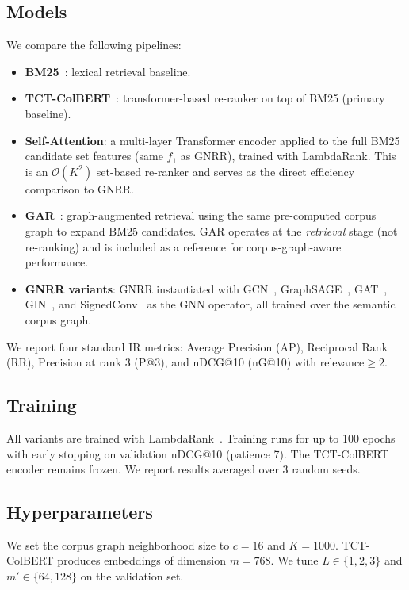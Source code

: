 \documentclass[runningheads]{llncs}
\newcommand{\ModelName}{GNRR\xspace}
\begin{document}
\subsection{Models}
We compare the following pipelines:
\begin{itemize}
    \item \textbf{BM25}~\cite{bm25}: lexical retrieval baseline.
    \item \textbf{TCT-ColBERT}~\cite{tctcolbert}: transformer-based re-ranker on top of BM25 (primary baseline).
    \item \textbf{Self-Attention}: a multi-layer Transformer encoder applied to the full BM25 candidate set features (same $f_1$ as \ModelName), trained with LambdaRank. This is an $\mathcal{O}(K^2)$ set-based re-ranker and serves as the direct efficiency comparison to \ModelName.
    \item \textbf{GAR}~\cite{corpusgraph}: graph-augmented retrieval using the same pre-computed corpus graph to expand BM25 candidates. GAR operates at the \emph{retrieval} stage (not re-ranking) and is included as a reference for corpus-graph-aware performance.
    \item \textbf{GNRR variants}: \ModelName instantiated with GCN~\cite{GCN}, GraphSAGE~\cite{GraphSAGE}, GAT~\cite{GAT}, GIN~\cite{GIN}, and SignedConv~\cite{signedconv} as the GNN operator, all trained over the semantic corpus graph.
\end{itemize}
We report four standard IR metrics: Average Precision (AP), Reciprocal Rank (RR), Precision at rank 3 (P@3), and nDCG@10 (nG@10) with relevance$\geq 2$.

\subsection{Training}
All variants are trained with LambdaRank~\cite{lambdarank}. Training runs for up to 100 epochs with early stopping on validation nDCG@10 (patience 7). The TCT-ColBERT encoder remains frozen. We report results averaged over 3 random seeds.

\subsection{Hyperparameters}
We set the corpus graph neighborhood size to $c = 16$ and $K = 1000$. TCT-ColBERT produces embeddings of dimension $m = 768$. We tune $L \in \{1, 2, 3\}$ and $m' \in \{64, 128\}$ on the validation set.

\end{document}
